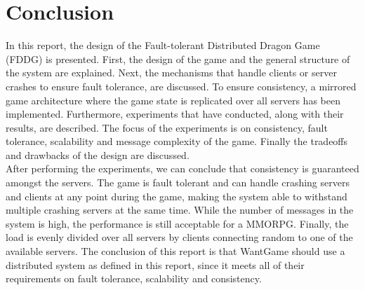 \section{Conclusion}
In this report, the design of the Fault-tolerant Distributed Dragon Game (FDDG) is presented. 
First, the design of the game and the general structure of the system are explained. 
Next, the mechanisms that handle clients or server crashes to ensure fault tolerance, are discussed. 
To ensure consistency, a mirrored game architecture where the game state is replicated over all servers has been implemented. 
Furthermore, experiments that have conducted, along with their results, are described. 
The focus of the experiments is on consistency, fault tolerance, scalability and message complexity of the game. 
Finally the tradeoffs and drawbacks of the design are discussed.\\
After performing the experiments, we can conclude that consistency is guaranteed amongst the servers. 
The game is fault tolerant and can handle crashing servers and clients at any point during the game, making the system able to withstand multiple crashing servers at the same time. 
While the number of messages in the system is high, the performance is still acceptable for a MMORPG. 
Finally, the load is evenly divided over all servers by clients connecting random to one of the available servers.
The conclusion of this report is that WantGame should use a distributed system as defined in this report, since it meets all of their requirements on fault tolerance, scalability and consistency.